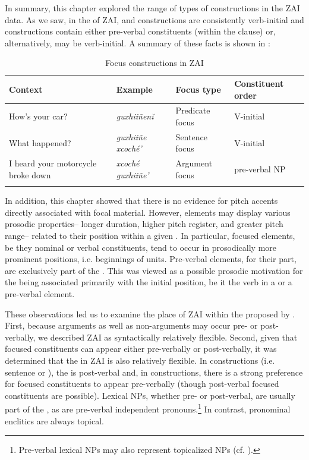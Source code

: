 In summary, this chapter explored the range of types of  constructions in the ZAI data. As we saw, in the  of ZAI,  and  constructions are consistently verb-initial and  constructions contain either pre-verbal constituents (within the clause) or, alternatively, may be verb-initial. A summary of these facts is shown in :


\begin{table}
\caption{{Focus constructions in ZAI}}
\label{allfocus}
\begin{tabularx}{\textwidth}{X l  l l@{}} 
\lsptoprule
Context & Example & Focus type & Constituent order \\ 
\midrule 
How's your car? & \textit{guxhii\~{n}en\v{i}} &  {Predicate} {focus} &  {V-initial} \\ 
\tablevspace
What happened? & \textit{guxhii\~{n}e xcoch\'{e}'} &  {Sentence}  {focus}&  {V-initial} \\ 
\tablevspace
I heard your motorcycle broke down  & \textit{xcoch\'{e} guxhii\~{n}e'} &  {Argument}  {focus} & pre-verbal NP \\ 
 \lspbottomrule
 \end{tabularx}
\end{table}


In addition, this chapter showed that there is no evidence for pitch accents directly associated with focal material. However, elements may display various prosodic properties-- longer duration, higher pitch register, and greater pitch range-- related to their position within a given . In particular, focused elements, be they nominal or verbal constituents, tend to occur in prosodically more prominent positions, i.e. beginnings of  units. Pre-verbal elements, for their part, are exclusively part of the . This was viewed as a possible prosodic motivation for the  being associated primarily with the initial position, be it the verb in a  or a pre-verbal element.

These observations led us to examine the place of ZAI within the  proposed by \citet{vanvalin1999}. First, because arguments as well as non-arguments may occur pre- or post-verbally, we described ZAI as syntactically relatively flexible. Second, given that focused constituents can appear either pre-verbally or post-verbally, it was determined that the  in ZAI is also relatively flexible. In  constructions (i.e. sentence or ), the  is post-verbal and, in  constructions, there is a strong preference for focused constituents to appear pre-verbally (though post-verbal focused constituents are possible). Lexical NPs, whether pre- or post-verbal, are usually part of the , as are pre-verbal independent pronouns.\footnote{Pre-verbal lexical NPs may also represent topicalized NPs (cf. ).} In contrast, pronominal enclitics are always topical. 

